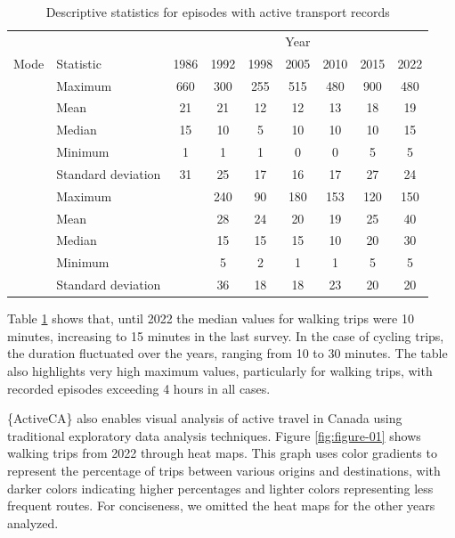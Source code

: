 \documentclass[Royal,times,sageh]{sagej}
\begin{document}
\begin{longtable}[t]{>{}llccccccc}
\caption{\label{tab:table-01}\label{tab:table-01}Descriptive statistics for episodes with active transport records}\\
\toprule
\multicolumn{2}{c}{ } & \multicolumn{7}{c}{Year} \\
\cmidrule(l{3pt}r{3pt}){3-9}
Mode & Statistic & 1986 & 1992 & 1998 & 2005 & 2010 & 2015 & 2022\\
\midrule
 & Maximum & 660 & 300 & 255 & 515 & 480 & 900 & 480\\
\nopagebreak
 & Mean & 21 & 21 & 12 & 12 & 13 & 18 & 19\\
\nopagebreak
 & Median & 15 & 10 & 5 & 10 & 10 & 10 & 15\\
\nopagebreak
 & Minimum & 1 & 1 & 1 & 0 & 0 & 5 & 5\\
\nopagebreak
\multirow[t]{-5}{*}{\raggedright\arraybackslash \textbf{Walking}} & Standard deviation & 31 & 25 & 17 & 16 & 17 & 27 & 24\\
\cmidrule{1-9}\pagebreak[0]
 & Maximum &  & 240 & 90 & 180 & 153 & 120 & 150\\
\nopagebreak
 & Mean &  & 28 & 24 & 20 & 19 & 25 & 40\\
\nopagebreak
 & Median &  & 15 & 15 & 15 & 10 & 20 & 30\\
\nopagebreak
 & Minimum &  & 5 & 2 & 1 & 1 & 5 & 5\\
\nopagebreak
\multirow[t]{-5}{*}{\raggedright\arraybackslash \textbf{Cycling}} & Standard deviation &  & 36 & 18 & 18 & 23 & 20 & 20\\
\bottomrule
\end{longtable}
\endgroup{}

Table \ref{tab:table-01} shows that, until 2022 the median values for
walking trips were 10 minutes, increasing to 15 minutes in the last
survey. In the case of cycling trips, the duration fluctuated over the
years, ranging from 10 to 30 minutes. The table also highlights very
high maximum values, particularly for walking trips, with recorded
episodes exceeding 4 hours in all cases.

\{ActiveCA\} also enables visual analysis of active travel in Canada
using traditional exploratory data analysis techniques. Figure
\ref{fig:figure-01} shows walking trips from 2022 through heat maps.
This graph uses color gradients to represent the percentage of trips
between various origins and destinations, with darker colors indicating
higher percentages and lighter colors representing less frequent routes.
For conciseness, we omitted the heat maps for the other years analyzed.
\end{document}
